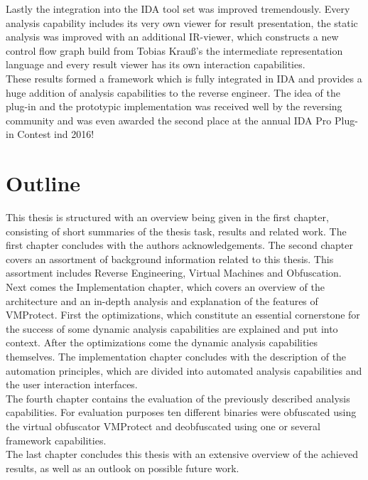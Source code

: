 \documentclass[10pt,twoside,a4paper,bibliography=totoc]{scrbook}
\newcommand{\echoOther}[1]{Tobias Krau{\ss}}
\begin{document}
Lastly the integration into the IDA tool set was improved tremendously. Every analysis capability includes its very own viewer for result presentation, the static analysis was improved with an additional IR-viewer, which constructs a new control flow graph build from \echoOther{}'s the intermediate representation language and every result viewer has its own interaction capabilities.\\
These results formed a framework which is fully integrated in IDA and provides a huge addition of analysis capabilities to the reverse engineer. 
The idea of the plug-in and the prototypic implementation was received well by the reversing community and was even awarded the second place at the annual IDA Pro Plug-in Contest ind 2016!


\section{Outline}
\label{sec1:outl}
This thesis is structured with an overview being given in the first chapter, consisting of short summaries of the thesis task, results and related work. The first chapter concludes with the authors acknowledgements. The second chapter covers an assortment of background information related to this thesis. This assortment includes Reverse Engineering, Virtual Machines and Obfuscation.\\
Next comes the Implementation chapter, which covers an overview of the architecture and an in-depth analysis and explanation of the features of VMProtect. First the optimizations, which constitute an essential cornerstone for the success of some dynamic analysis capabilities are explained and put into context. After the optimizations come the dynamic analysis capabilities themselves. The implementation chapter concludes with the description of the automation principles, which are divided into automated analysis capabilities and the user interaction interfaces.  \\
The fourth chapter contains the evaluation of the previously described analysis capabilities. For evaluation purposes ten different binaries were obfuscated using the virtual obfuscator VMProtect\cite{vm_prot} and deobfuscated using one or several framework capabilities.  \\
The last chapter concludes this thesis with an extensive overview of the achieved results, as well as an outlook on possible future work.
\end{document}
